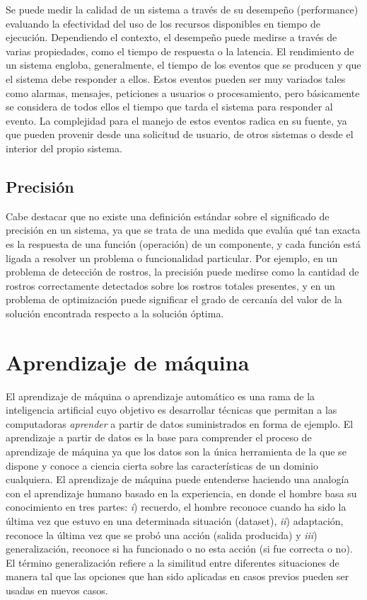 Se puede medir la calidad de un sistema a través de su desempeño (performance)
evaluando la efectividad del uso de los recursos disponibles en tiempo
de ejecución. Dependiendo el contexto, el desempeño puede medirse
a través de varias propiedades, como el tiempo de respuesta o la latencia.
El rendimiento de un sistema engloba, generalmente, el tiempo de los
eventos que se producen y que el sistema debe responder a ellos. Estos
eventos pueden ser muy variados tales como alarmas, mensajes, peticiones
a usuarios o procesamiento, pero básicamente se considera de todos
ellos el tiempo que tarda el sistema para responder al evento. La
complejidad para el manejo de estos eventos radica en su fuente, ya
que pueden provenir desde una solicitud de usuario, de otros sistemas
o desde el interior del propio sistema. 


\subsection*{Precisión\label{subsec:Atributos-de-calidad-Precisi=0000F3n}}

Cabe destacar que no existe una definición estándar sobre el significado
de precisión en un sistema, ya que se trata de una medida que evalúa
qué tan exacta es la respuesta de una función (operación) de un componente,
y cada función está ligada a resolver un problema o funcionalidad
particular. Por ejemplo, en un problema de detección de rostros, la
precisión puede medirse como la cantidad de rostros correctamente
detectados sobre los rostros totales presentes, y en un problema de
optimización puede significar el grado de cercanía del valor de la
solución encontrada respecto a la solución óptima.


\section{Aprendizaje de máquina \label{sec:Aprendizaje-de-maquina}}

El aprendizaje de máquina  o aprendizaje automático es una rama de
la inteligencia artificial cuyo objetivo es desarrollar técnicas que
permitan a las computadoras \emph{aprender} a partir de datos suministrados
en forma de ejemplo. El aprendizaje a partir de datos es la base para
comprender el proceso de aprendizaje de máquina ya que los datos son
la única herramienta de la que se dispone y conoce a ciencia cierta
sobre las características de un dominio cualquiera. El aprendizaje
de máquina puede entenderse haciendo una analogía con el aprendizaje
humano basado en la experiencia, en donde el hombre basa su conocimiento
en tres partes: \emph{i}) recuerdo, el hombre reconoce cuando ha sido
la última vez que estuvo en una determinada situación (dataset), \emph{ii})
adaptación, reconoce la última vez que se probó una acción (salida
producida) y \emph{iii}) generalización, reconoce si ha funcionado
o no esta acción (si fue correcta o no). El término generalización
refiere a la similitud entre diferentes situaciones de manera tal
que las opciones que han sido aplicadas en casos previos pueden ser
usadas en nuevos casos.

